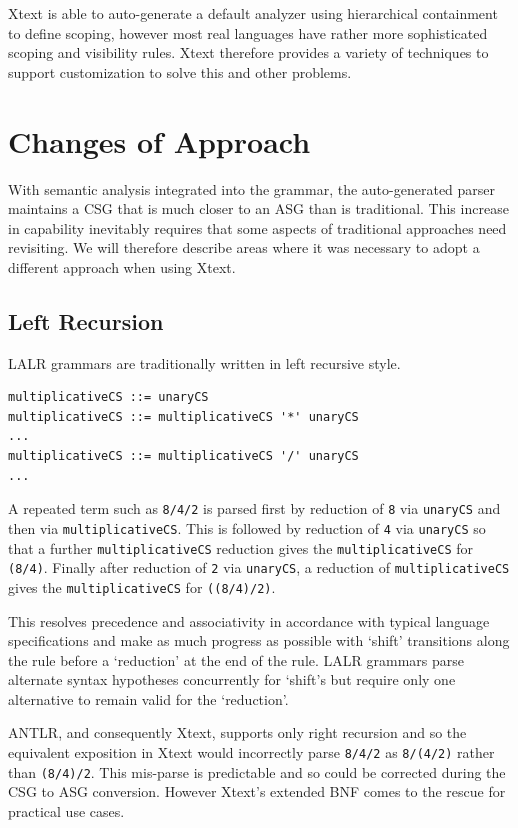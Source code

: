 \documentclass[runningheads,a4paper]{llncs}
\begin{document}
Xtext is able to auto-generate a default analyzer using hierarchical containment to define scoping, however most real languages have rather more sophisticated scoping and visibility rules. Xtext therefore provides a variety of techniques to support customization to solve this and other problems.

\section{Changes of Approach}

With semantic analysis integrated into the grammar, the auto-generated parser maintains a CSG that is much closer to an ASG than is traditional. This increase in capability inevitably requires that some aspects of traditional approaches need revisiting. We will therefore describe areas where it was necessary to adopt a different approach when using Xtext.

\subsection{Left Recursion}

LALR grammars are traditionally written in left recursive style. 

{\small\begin{verbatim}
multiplicativeCS ::= unaryCS
multiplicativeCS ::= multiplicativeCS '*' unaryCS
...
multiplicativeCS ::= multiplicativeCS '/' unaryCS
...
\end{verbatim}}

A repeated term such as \verb+8/4/2+ is parsed first by reduction of \verb+8+ via \verb+unaryCS+ and then via \verb+multiplicativeCS+. This is followed by reduction of \verb+4+ via \verb+unaryCS+ so that a further \verb+multiplicativeCS+ reduction gives the  \verb+multiplicativeCS+ for \verb+(8/4)+. Finally after reduction of \verb+2+ via \verb+unaryCS+, a reduction of \verb+multiplicativeCS+ gives the \verb+multiplicativeCS+ for \verb+((8/4)/2)+.

This resolves precedence and associativity in accordance with typical language specifications and make as much progress as possible with `shift' transitions along the rule before a `reduction' at the end of the rule. LALR grammars parse alternate syntax hypotheses concurrently for `shift's but require only one alternative to remain valid for the `reduction'.

ANTLR, and consequently Xtext, supports only right recursion and so the equivalent exposition in Xtext would incorrectly parse \verb+8/4/2+ as \verb+8/(4/2)+ rather than \verb+(8/4)/2+. This mis-parse is predictable and so could be corrected during the CSG to ASG conversion. However Xtext's extended BNF comes to the rescue for practical use cases.
\end{document}

